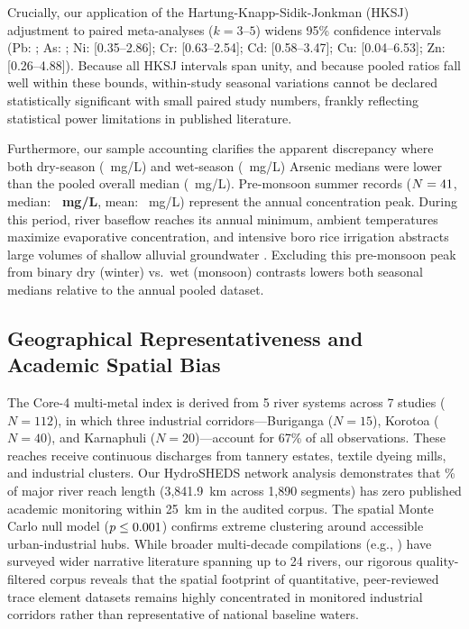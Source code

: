 \documentclass[authoryear,preprint,12pt]{elsarticle}
\begin{document}
Crucially, our application of the Hartung-Knapp-Sidik-Jonkman (HKSJ) adjustment to paired meta-analyses ($k=3\text{--}5$) widens 95\% confidence intervals (Pb: \LeadWithinStudyHksjCi; As: \ArsenicWithinStudyHksjCi; Ni: [0.35--2.86]; Cr: [0.63--2.54]; Cd: [0.58--3.47]; Cu: [0.04--6.53]; Zn: [0.26--4.88]). Because all HKSJ intervals span unity, and because pooled ratios fall well within these bounds, within-study seasonal variations cannot be declared statistically significant with small paired study numbers, frankly reflecting statistical power limitations in published literature.

Furthermore, our sample accounting clarifies the apparent discrepancy where both dry-season (\ArsenicDryMedian~mg/L) and wet-season (\ArsenicWetMedian~mg/L) Arsenic medians were lower than the pooled overall median (\ArsenicOverallMedian~mg/L). Pre-monsoon summer records ($N=41$, median: \textbf{\ArsenicPremonsoonMedian~mg/L}, mean: \ArsenicPremonsoonMean~mg/L) represent the annual concentration peak. During this period, river baseflow reaches its annual minimum, ambient temperatures maximize evaporative concentration, and intensive boro rice irrigation abstracts large volumes of shallow alluvial groundwater \citep{Brammer2009,Halim2015}. Excluding this pre-monsoon peak from binary dry (winter) vs.\ wet (monsoon) contrasts lowers both seasonal medians relative to the annual pooled dataset.

\subsection{Geographical Representativeness and Academic Spatial Bias}
The Core-4 multi-metal index is derived from 5 river systems across 7 studies ($N=112$), in which three industrial corridors—Buriganga ($N=15$), Korotoa ($N=40$), and Karnaphuli ($N=20$)—account for 67\% of all observations. These reaches receive continuous discharges from tannery estates, textile dyeing mills, and industrial clusters. Our HydroSHEDS network analysis demonstrates that \UnsampledPctLengthTwentyFiveKm\% of major river reach length (3,841.9~km across 1,890 segments) has zero published academic monitoring within 25~km in the audited corpus. The spatial Monte Carlo null model ($p \le 0.001$) confirms extreme clustering around accessible urban-industrial hubs. While broader multi-decade compilations (e.g., \citealt{Bilal2023,Proshad2025}) have surveyed wider narrative literature spanning up to 24 rivers, our rigorous quality-filtered corpus reveals that the spatial footprint of quantitative, peer-reviewed trace element datasets remains highly concentrated in monitored industrial corridors rather than representative of national baseline waters.
\end{document}
